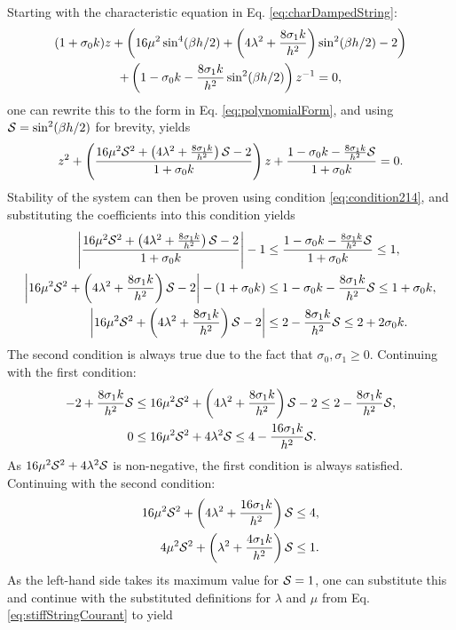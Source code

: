 Starting with the characteristic equation in Eq. \eqref{eq:charDampedString}:
\begin{gather*}
    (1+\sz k)z + \left(16\mu^2\sin^4(\beta h/2)+\left(4\lambda^2+\frac{8\so k}{h^2}\right)\sin^2(\beta h/2) - 2\right)\nonumber\\
    +\left(1-\sz k-\frac{8\so k}{h^2}\sin^2(\beta h/2)\right)z^{-1}=0,
\end{gather*}
one can rewrite this to the form in Eq. \eqref{eq:polynomialForm}, and using $\S = \sin^2(\beta h /2)$ for brevity, yields
\begin{equation*}
    z^2 + \left(\frac{16\mu^2\S^2+\left(4\lambda^2+\frac{8\so k}{h^2}\right)\S - 2}{1 + \sz k}\right)z+\frac{1-\sz k-\frac{8\so k}{h^2}\S}{1 + \sz k}=0.
\end{equation*}
Stability of the system can then be proven using condition \eqref{eq:condition214}, and substituting the coefficients into this condition yields
\begin{equation}\nonumber
    \begin{aligned}
        \left|\frac{16\mu^2\S^2+\left(4\lambda^2+\frac{8\so k}{h^2}\right)\S - 2}{1+\sz k}\right|-1 &\leq \frac{1-\sz k-\frac{8\so k}{h^2}\S}{1+\sz k}\leq 1,\\
        \left|16\mu^2\S^2+\left(4\lambda^2+\frac{8\so k}{h^2}\right)\S - 2\right|-(1+\sz k) &\leq 1-\sz k-\frac{8\so k}{h^2}\S\leq 1+\sz k,\\
        \left|16\mu^2\S^2+\left(4\lambda^2+\frac{8\so k}{h^2}\right)\S - 2\right|&\leq2-\frac{8\so k}{h^2}\S\leq2+2\sz k.
    \end{aligned}
\end{equation}
The second condition is always true due to the fact that $\sigma_0,\sigma_1 \geq 0$. Continuing with the first condition: 
\begin{align*}
    -2+\frac{8\so k}{h^2}\S&\leq 16\mu^2\S^2+\left(4\lambda^2+\frac{8\so k}{h^2}\right)\S - 2\leq 2-\frac{8\so k}{h^2}\S,\\
    0&\leq 16\mu^2\S^2+4\lambda^2\S\leq 4-\frac{16\so k}{h^2}\S.
\end{align*}
As $16\mu^2\S^2+4\lambda^2\S$ is non-negative, the first condition is always satisfied. Continuing with the second condition:
\begin{align*}
    16\mu^2\S^2+\left(4\lambda^2+ \frac{16\so k}{h^2}\right)\S &\leq 4,\\
    4\mu^2\S^2+\left(\lambda^2+ \frac{4\so k}{h^2}\right)\S&\leq 1.
\end{align*}
As the left-hand side takes its maximum value for $\S= 1$, one can substitute this and continue with the substituted definitions for $\lambda$ and $\mu$ from Eq. \eqref{eq:stiffStringCourant} to yield

